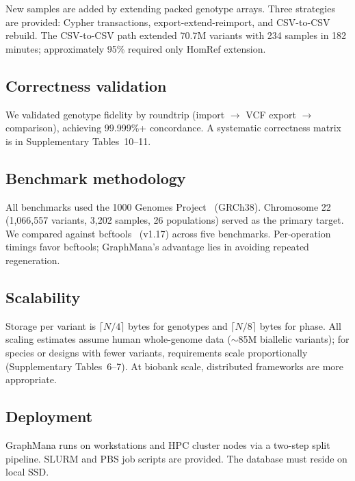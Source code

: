 \documentclass[pdflatex,sn-nature]{sn-jnl}
\begin{document}
New samples are added by extending packed genotype arrays. Three strategies are provided: Cypher transactions, export-extend-reimport, and CSV-to-CSV rebuild. The CSV-to-CSV path extended 70.7M variants with 234 samples in 182 minutes; approximately 95\% required only HomRef extension.

\subsection*{Correctness validation}

We validated genotype fidelity by roundtrip (import $\to$ VCF export $\to$ comparison), achieving 99.999\%+ concordance. A systematic correctness matrix is in Supplementary Tables~10--11.

\subsection*{Benchmark methodology}

All benchmarks used the 1000 Genomes Project~\cite{byrska2022} (GRCh38). Chromosome 22 (1,066,557 variants, 3,202 samples, 26 populations) served as the primary target. We compared against bcftools~\cite{danecek2021bcftools} (v1.17) across five benchmarks. Per-operation timings favor bcftools; GraphMana's advantage lies in avoiding repeated regeneration.

\subsection*{Scalability}

Storage per variant is $\lceil N/4 \rceil$ bytes for genotypes and $\lceil N/8 \rceil$ bytes for phase. All scaling estimates assume human whole-genome data ($\sim$85M biallelic variants); for species or designs with fewer variants, requirements scale proportionally (Supplementary Tables~6--7). At biobank scale, distributed frameworks are more appropriate.

\subsection*{Deployment}

GraphMana runs on workstations and HPC cluster nodes via a two-step split pipeline. SLURM and PBS job scripts are provided. The database must reside on local SSD.

\backmatter
\end{document}
